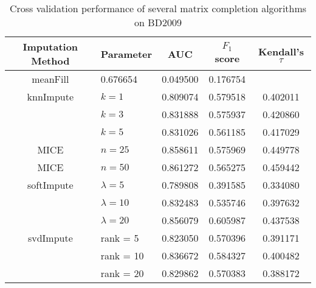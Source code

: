 \begin{table}[htbp]
\centering
\begin{tabular}{cl||ccc}
\toprule
Imputation Method & Parameter & AUC & $F_1$ score & Kendall's $\tau$ \\
\midrule 
meanFill &  0.676654 &  0.049500 &  0.176754 \\
\midrule
knnImpute & $k = 1$ &  0.809074 &  0.579518 &  0.402011 \\
  & $k = 3$  &  0.831888 &  0.575937 &  0.420860 \\
  & $k = 5$ &  0.831026 &  0.561185 &  0.417029 \\
\midrule
MICE & $n = 25$  &  0.858611 &  0.575969 &  0.449778 \\
MICE & $n = 50$  &  0.861272 &  0.565275 &  0.459442 \\
\midrule
softImpute & $\lambda=5$ &  0.789808 &  0.391585 &  0.334080 \\
& $\lambda=10$ &  0.832483 &  0.535746 &  0.397632 \\
& $\lambda=20$ &  0.856079 &  0.605987 &  0.437538 \\
             
\midrule
svdImpute & rank = 5  &  0.823050 &  0.570396 &  0.391171 \\
& rank = 10  &  0.836672 &  0.584327 &  0.400482 \\
& rank = 20  &  0.829862 &  0.570383 &  0.388172 \\
\bottomrule[1.25pt]
\end{tabular}
\begin{center}
\caption{Cross validation performance of several matrix completion algorithms on BD2009} \label{tab:imputation}
\end{center}
\end{table}

